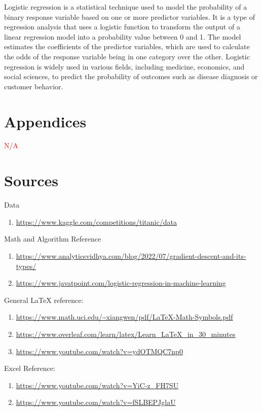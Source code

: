 \documentclass[notitlepage,a4paper,oneside,article,table]{article}
\begin{document}
Logistic regression is a statistical technique used to model the probability of a binary response variable based on one or more predictor variables. It is a type of regression analysis that uses a logistic function to transform the output of a linear regression model into a probability value between 0 and 1. The model estimates the coefficients of the predictor variables, which are used to calculate the odds of the response variable being in one category over the other. Logistic regression is widely used in various fields, including medicine, economics, and social sciences, to predict the probability of outcomes such as disease diagnosis or customer behavior.


\section{Appendices}
\textcolor{red}{N/A}

\section{Sources}

Data
\begin{enumerate}
    \item \url{https://www.kaggle.com/competitions/titanic/data}
\end{enumerate}

Math and Algorithm Reference
\begin{enumerate}
    \item \url{https://www.analyticsvidhya.com/blog/2022/07/gradient-descent-and-its-types/}
    \item \url{https://www.javatpoint.com/logistic-regression-in-machine-learning}
\end{enumerate}

General LaTeX reference: 

\begin{enumerate}
    \item \url{https://www.math.uci.edu/~xiangwen/pdf/LaTeX-Math-Symbols.pdf}
    \item \url{https://www.overleaf.com/learn/latex/Learn_LaTeX_in_30_minutes}
    \item \url{https://www.youtube.com/watch?v=ydOTMQC7np0}
\end{enumerate}

Excel Reference:
\begin{enumerate}
    \item \url{https://www.youtube.com/watch?v=YiC-z_FH7SU}
    \item \url{https://www.youtube.com/watch?v=fSLBEPJglaU}
\end{enumerate}
\end{document}
